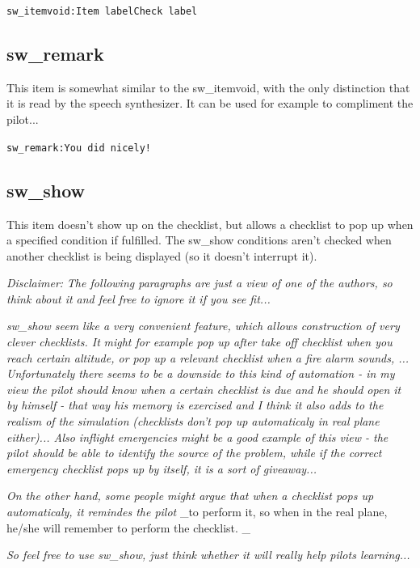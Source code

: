 \documentclass[11pt,parskip=half,a4paper]{scrartcl}
\newcommand\textstyleSourceText[1]{\texttt{#1}}
\newcommand\textstyleEmphasis[1]{\textit{#1}}
\begin{document}
\textstyleSourceText{sw\_itemvoid:Item label{\textbar}Check label}

\subsection{sw\_remark}
This item is somewhat similar to the sw\_itemvoid, with the only distinction that it is read by the speech synthesizer. It can be used for example to compliment the pilot...

\textstyleSourceText{sw\_remark:You did nicely!}

\subsection{sw\_show}
This item doesn't show up on the checklist, but allows a checklist to pop up when a specified condition if fulfilled. The sw\_show conditions aren't checked when another checklist is being displayed (so it doesn't interrupt it).

\textstyleEmphasis{Disclaimer:} \textstyleEmphasis{The following paragraphs are just a view of one of the authors, so think about it and feel free to} \textstyleEmphasis{ignore it if you see fit...}

\textstyleEmphasis{sw\_show seem like a very convenient feature, which allows construction of very clever checklists. It} \textstyleEmphasis{might for example pop up after take off checklist when you reach certain altitude, or pop up a relevant} \textstyleEmphasis{checklist when a fire alarm sounds, ... Unfortunately there seems to be a downside to this kind of} \textstyleEmphasis{automation - in my view the pilot should know when a certain checklist is due and he should open it} \textstyleEmphasis{by himself - that way his memory is exercised and I think it also adds to the realism of the simulation} \textstyleEmphasis{(checklists don't pop up automaticaly in real plane either)... Also inflight emergencies might be a good} \textstyleEmphasis{example of this view - the pilot should be able to identify the source of the problem, while if the correct} \textstyleEmphasis{emergency checklist pops up by itself, it is a sort of
giveaway...}

\textstyleEmphasis{On the other hand, some people might argue that when a checklist pops up automaticaly, it remindes the pilot} \_to perform it, so when in the real plane, he/she will remember to perform the checklist. \_

\textstyleEmphasis{So feel free to use sw\_show, just think whether it will really help pilots learning...}
\end{document}
